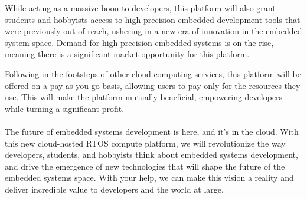 \documentclass{article}
\begin{document}
    While acting as a massive boon to developers, this platform will also grant 
    students and hobbyists access to high precision embedded development tools
    that were previously out of reach, ushering in a new era of innovation in
    the embedded system space. Demand for high precision embedded systems is
    on the rise, meaning there is a significant market opportunity for this
    platform.

    Following in the footsteps of other cloud computing services, this platform
    will be offered on a pay-as-you-go basis, allowing users to pay only for the
    resources they use. This will make the platform mutually beneficial,
    empowering developers while turning a significant profit. \\ \hfill \\

    The future of embedded systems development is here, and it's in the cloud. 
    With this new cloud-hosted RTOS compute platform, we will revolutionize the way developers, students,
    and hobbyists think about embedded systems development, and drive the
    emergence of new technologies that will shape the future of the embedded
    systems space.  With your help, we can make this vision a reality and 
    deliver incredible value to developers and the world at large.
\end{document}

